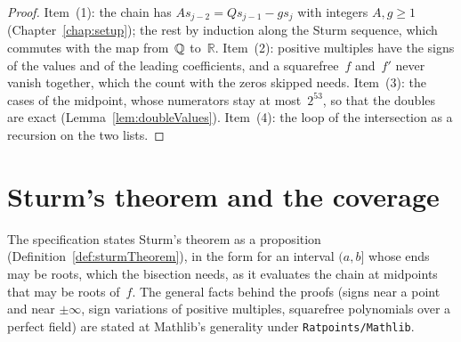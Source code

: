 \begin{proof}
  \leanok
  Item~(1): the chain has $A s_{j-2} = Q s_{j-1} - g s_j$ with integers $A, g \ge 1$
  (Chapter~\ref{chap:setup}); the rest by induction along the Sturm sequence, which commutes with
  the map from~$\mathbb{Q}$ to~$\mathbb{R}$. Item~(2): positive multiples have the signs of the values and
  of the leading coefficients, and a squarefree~$f$ and~$f'$ never vanish together, which the count
  with the zeros skipped needs. Item~(3): the cases of the midpoint, whose numerators stay at
  most~$2^{53}$, so that the doubles are exact (Lemma~\ref{lem:doubleValues}). Item~(4): the loop
  of the intersection as a recursion on the two lists.
\end{proof}

\section{Sturm's theorem and the coverage}\label{sec:sturmCoverage}

The specification states Sturm's theorem as a proposition (Definition~\ref{def:sturmTheorem}), in
the form for an interval $(a, b]$ whose ends may be roots, which the bisection needs, as it
evaluates the chain at midpoints that may be roots of~$f$. The general facts behind the proofs
(signs near a point and near $\pm\infty$, sign variations of positive multiples, squarefree
polynomials over a perfect field) are stated at Mathlib's generality under \verb|Ratpoints/Mathlib|.

